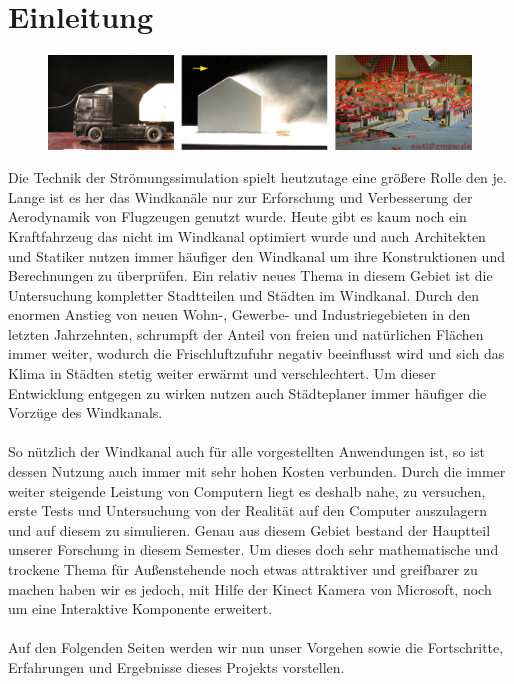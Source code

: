\chapter{Einleitung}
\begin{Spacing}{\mylinespace}
\begin{figure}[h!]
	\centering
	\includegraphics[width=\textwidth]{graphics/intro.png}
	\vspace{20px}
\end{figure}
Die Technik der Strömungssimulation spielt heutzutage eine größere Rolle den je. Lange ist es her das Windkanäle nur zur Erforschung und Verbesserung der Aerodynamik von Flugzeugen genutzt wurde. Heute gibt es kaum noch ein Kraftfahrzeug das nicht im Windkanal optimiert wurde und auch Architekten und Statiker nutzen immer häufiger den Windkanal um ihre Konstruktionen und Berechnungen zu überprüfen. Ein relativ neues Thema in diesem Gebiet ist die Untersuchung kompletter Stadtteilen und Städten im Windkanal. Durch den enormen Anstieg von neuen Wohn-, Gewerbe- und Industriegebieten in den letzten Jahrzehnten, schrumpft der Anteil von freien und natürlichen Flächen immer weiter, wodurch die Frischluftzufuhr negativ beeinflusst wird und sich das Klima in Städten stetig weiter erwärmt und verschlechtert. Um dieser Entwicklung entgegen zu wirken nutzen auch Städteplaner immer häufiger die Vorzüge des Windkanals.
\\\\
So nützlich der Windkanal auch für alle vorgestellten Anwendungen ist, so ist dessen Nutzung auch immer mit sehr hohen Kosten verbunden. Durch die immer weiter steigende Leistung von Computern liegt es deshalb nahe, zu versuchen, erste Tests und Untersuchung von der Realität auf den Computer auszulagern und auf diesem zu simulieren. Genau aus diesem Gebiet bestand der Hauptteil unserer Forschung in diesem Semester. Um dieses doch sehr mathematische und trockene Thema für Außenstehende noch etwas attraktiver und greifbarer zu machen haben wir es jedoch, mit Hilfe der Kinect Kamera von Microsoft, noch um eine Interaktive Komponente erweitert.
\\\\
Auf den Folgenden Seiten werden wir nun unser Vorgehen sowie die Fortschritte, Erfahrungen und Ergebnisse dieses Projekts vorstellen.
\end{Spacing}
\newpage
\clearpage
